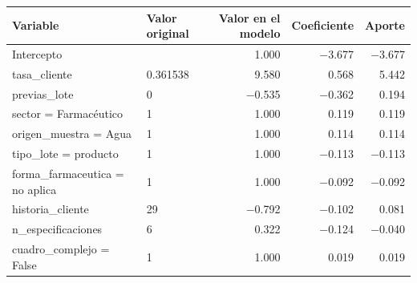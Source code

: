 \begin{tabular}{llrrr}
\toprule
Variable & Valor original & Valor en el modelo & Coeficiente & Aporte \\
\midrule
Intercepto &  & 1.000 & $-$3.677 & $-$3.677 \\
tasa\_cliente & 0.361538 & 9.580 & 0.568 & 5.442 \\
previas\_lote & 0 & $-$0.535 & $-$0.362 & 0.194 \\
sector = Farmacéutico & 1 & 1.000 & 0.119 & 0.119 \\
origen\_muestra = Agua & 1 & 1.000 & 0.114 & 0.114 \\
tipo\_lote = producto & 1 & 1.000 & $-$0.113 & $-$0.113 \\
forma\_farmaceutica = no aplica & 1 & 1.000 & $-$0.092 & $-$0.092 \\
historia\_cliente & 29 & $-$0.792 & $-$0.102 & 0.081 \\
n\_especificaciones & 6 & 0.322 & $-$0.124 & $-$0.040 \\
cuadro\_complejo = False & 1 & 1.000 & 0.019 & 0.019 \\
\bottomrule
\end{tabular}
